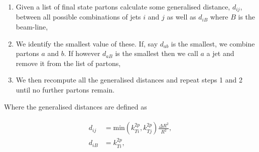 	\begin{enumerate}
		\item Given a list of final state partons calculate some generalised distance, $d_{ij}$, between all possible
		      combinations of jets $i$ and $j$ as well as $d_{iB}$ where $B$ is the beam-line,
		\item We identify the smallest value of these.  If, say $d_{ab}$ is the smallest, we combine partons $a$ and $b$.
		      If however $d_{aB}$ is the smallest then we call $a$ a jet and remove it from the list of partons,
		\item We then recompute all the generalised distances and repeat steps 1 and 2 until no further partons remain.
	\end{enumerate}

	Where the generalised distances are defined as

	\begin{align}
	\begin{split}
		d_{ij} &= \text{min}(k_{Ti}^{2p}, k_{Tj}^{2p})\frac{\Delta R^2}{R^2},\\
		d_{iB} &= k_{Ti}^{2p},
	\end{split}
	\end{align}

